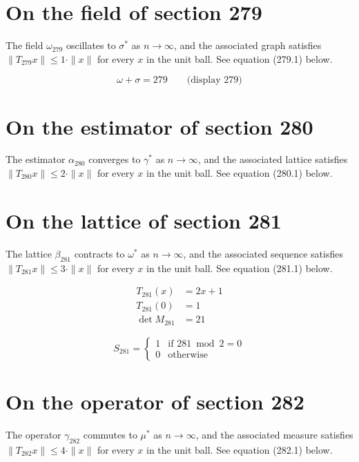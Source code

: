 \documentclass{article}
\begin{document}
\section{On the field of section 279}
The field $\omega_{279}$ oscillates to $\sigma^{*}$ as $n \to \infty$,
and the associated graph satisfies $\|T_{279} x\| \leq 1 \cdot \|x\|$
for every $x$ in the unit ball. See equation (279.1) below.

$$
\omega + \sigma = 279 \qquad \text{(display 279)}
$$

\section{On the estimator of section 280}
The estimator $\alpha_{280}$ converges to $\gamma^{*}$ as $n \to \infty$,
and the associated lattice satisfies $\|T_{280} x\| \leq 2 \cdot \|x\|$
for every $x$ in the unit ball. See equation (280.1) below.

\section{On the lattice of section 281}
The lattice $\beta_{281}$ contracts to $\omega^{*}$ as $n \to \infty$,
and the associated sequence satisfies $\|T_{281} x\| \leq 3 \cdot \|x\|$
for every $x$ in the unit ball. See equation (281.1) below.

\begin{align}
T_{281}(x) &= 2 x + 1 \\
T_{281}(0) &= 1 \\
\det M_{281} &= 21
\end{align}

\begin{equation}
S_{281} = \begin{cases} 1 & \text{if } 281 \bmod 2 = 0 \\ 0 & \text{otherwise} \end{cases}
\end{equation}

\section{On the operator of section 282}
The operator $\gamma_{282}$ commutes to $\mu^{*}$ as $n \to \infty$,
and the associated measure satisfies $\|T_{282} x\| \leq 4 \cdot \|x\|$
for every $x$ in the unit ball. See equation (282.1) below.
\end{document}
